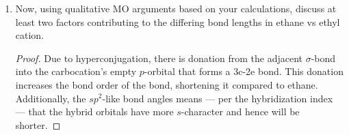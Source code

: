 \documentclass[../psets.tex]{subfiles}
\begin{document}
\begin{enumerate}
\begin{enumerate}
\begin{enumerate}
            \begin{proof}
                {\color{white}hi}
                \begin{center}
                    \texttt{[image: PSet1Q5ci.png]}
                \end{center}
            \end{proof}
            \item Convert the optimized structure into Cartesian (XYZ) coordinates and paste them here.
            \begin{proof}
                {\color{white}hi}\\
                H       -1.22084801 0.85147887 0.51800484\\
                C       -0.64953900 -0.05423031 0.27448674\\
                H       -0.17606995 0.13377943 -0.93834042\\
                H       -1.18064873 -1.01496471 0.24418216\\
                C       0.70652007 0.01092307 0.02934683\\
                H       1.28037984 -0.89670040 -0.20069381\\
                H       1.24020579 0.96971405 0.07301367
            \end{proof}
            \item What is the calculated optimized  bond distance? What is the  bond angle(s)?
            \begin{proof}
                 bond distance: \SI{1.380}{\angstrom}.\\
                 bond angle: \ang{118.43} and \ang{105.89}.
            \end{proof}
        \end{enumerate}
        \item Now, using qualitative MO arguments based on your calculations, discuss at least two factors contributing to the differing  bond lengths in ethane vs ethyl cation.
        \begin{proof}
            Due to hyperconjugation, there is donation from the adjacent  $\sigma$-bond into the carbocation's empty $p$-orbital that forms a 3c-2e bond. This donation increases the bond order of the  bond, shortening it compared to ethane. Additionally, the $sp^2$-like bond angles means --- per the hybridization index --- that the hybrid orbitals have more $s$-character and hence will be shorter.
        \end{proof}
    \end{enumerate}
\end{enumerate}
\end{document}
